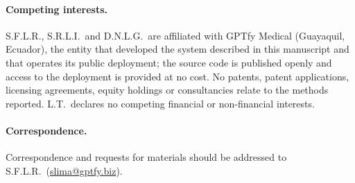 \paragraph{Competing interests.}
S.F.L.R., S.R.L.I.\ and D.N.L.G.\ are affiliated with GPTfy Medical
(Guayaquil, Ecuador), the entity that developed the \lchai{} system
described in this manuscript and that operates its public deployment;
the source code is published openly and access to the deployment is
provided at no cost. No patents, patent applications, licensing
agreements, equity holdings or consultancies relate to the methods
reported. L.T.\ declares no competing financial or non-financial
interests.

\paragraph{Correspondence.}
Correspondence and requests for materials should be addressed to
S.F.L.R.\ (\href{mailto:slima@gptfy.biz}{slima@gptfy.biz}).
\fi

